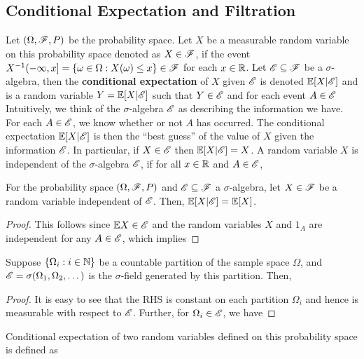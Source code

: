 \documentclass[letterpaper,10pt,english]{article}
\begin{document}
\subsection{Conditional Expectation and Filtration} 
Let $(\Omega, \mathscr{F}, P)$ be the probability space.  
Let $X$ be a measurable random variable on this probability space denoted as $X \in \mathscr{F}$, 
if the event $X^{-1}(-\infty, x] = \{\omega \in \Omega: X(\omega) \leq x\} \in \mathscr{F}$ for each $x \in \mathbb{R}$.  
Let $\mathscr{E} \subseteq \mathscr{F}$ be a $\sigma$-algebra, then the \textbf{conditional expectation} of $X$ given $\mathscr{E}$ is denoted $\mathbb{E}[X | \mathscr{E}]$ and is a random variable $Y = \mathbb{E}[X | \mathscr{E}]$ such that $Y \in \mathscr{E}$ and for each event $A \in \mathscr{E}$
Intuitively, we think of the $\sigma$-algebra $\mathscr{E}$ as describing the information we have. 
For each $A \in \mathscr{E}$, we know whether or not $A$ has occurred. 
The conditional expectation $\mathbb{E}[X|\mathscr{E}]$ is then the ``best guess'' of the value of $X$ given the information $\mathscr{E}$. 
In particular, if $X \in \mathscr{E}$ then $\mathbb{E}[X| \mathscr{E}] = X$. 
A random variable $X$ is independent of the $\sigma$-algebra $\mathscr{E}$, if for all $x \in \mathbb{R}$ and $A \in \mathscr{E}$, 
\begin{lem} 
For the probability space $(\Omega, \mathscr{F}, P)$ and $\mathscr{E} \subseteq \mathscr{F}$ a $\sigma$-algebra, 
let $X \in \mathscr{F}$ be a random variable independent of $\mathscr{E}$.  
Then, $\mathbb{E}[X| \mathscr{E}]  = \mathbb{E}[X]$. 
\end{lem}
\begin{proof}
This follows since $\mathbb{E} X \in \mathscr{E}$ and the random variables $X$ and $1_{A}$ are independent for any $A \in \mathscr{E}$, 
which implies 
\end{proof}
\begin{lem}
Suppose $\{\Omega_i: i \in \mathbb{N}\}$ be a countable partition of the sample space $\Omega$, and $\mathscr{E} = \sigma(\Omega_1, \Omega_2, \dots)$ is the $\sigma$-field generated by this partition. 
Then, 
\end{lem}
\begin{proof}
It is easy to see that the RHS is constant on each partition $\Omega_i$ and hence is measurable with respect to $\mathscr{E}$. 
Further, for $\Omega_i \in \mathscr{E}$, we have
\end{proof}
Conditional expectation of two random variables defined on this probability space is defined as 
\end{document}
